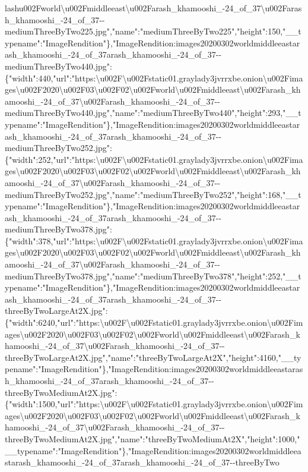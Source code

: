 lash{}u002Fworld\textbackslash{}u002Fmiddleeast\textbackslash{}u002Farash\_khamooshi\_-24\_of\_37\textbackslash{}u002Farash\_khamooshi\_-24\_of\_37-\/-mediumThreeByTwo225.jpg","name":"mediumThreeByTwo225","height":150,"\_\_typename":"ImageRendition"\},"ImageRendition:images20200302worldmiddleeastarash\_khamooshi\_-24\_of\_37arash\_khamooshi\_-24\_of\_37-\/-mediumThreeByTwo440.jpg":\{"width":440,"url":"https:\textbackslash{}u002F\textbackslash{}u002Fstatic01.graylady3jvrrxbe.onion\textbackslash{}u002Fimages\textbackslash{}u002F2020\textbackslash{}u002F03\textbackslash{}u002F02\textbackslash{}u002Fworld\textbackslash{}u002Fmiddleeast\textbackslash{}u002Farash\_khamooshi\_-24\_of\_37\textbackslash{}u002Farash\_khamooshi\_-24\_of\_37-\/-mediumThreeByTwo440.jpg","name":"mediumThreeByTwo440","height":293,"\_\_typename":"ImageRendition"\},"ImageRendition:images20200302worldmiddleeastarash\_khamooshi\_-24\_of\_37arash\_khamooshi\_-24\_of\_37-\/-mediumThreeByTwo252.jpg":\{"width":252,"url":"https:\textbackslash{}u002F\textbackslash{}u002Fstatic01.graylady3jvrrxbe.onion\textbackslash{}u002Fimages\textbackslash{}u002F2020\textbackslash{}u002F03\textbackslash{}u002F02\textbackslash{}u002Fworld\textbackslash{}u002Fmiddleeast\textbackslash{}u002Farash\_khamooshi\_-24\_of\_37\textbackslash{}u002Farash\_khamooshi\_-24\_of\_37-\/-mediumThreeByTwo252.jpg","name":"mediumThreeByTwo252","height":168,"\_\_typename":"ImageRendition"\},"ImageRendition:images20200302worldmiddleeastarash\_khamooshi\_-24\_of\_37arash\_khamooshi\_-24\_of\_37-\/-mediumThreeByTwo378.jpg":\{"width":378,"url":"https:\textbackslash{}u002F\textbackslash{}u002Fstatic01.graylady3jvrrxbe.onion\textbackslash{}u002Fimages\textbackslash{}u002F2020\textbackslash{}u002F03\textbackslash{}u002F02\textbackslash{}u002Fworld\textbackslash{}u002Fmiddleeast\textbackslash{}u002Farash\_khamooshi\_-24\_of\_37\textbackslash{}u002Farash\_khamooshi\_-24\_of\_37-\/-mediumThreeByTwo378.jpg","name":"mediumThreeByTwo378","height":252,"\_\_typename":"ImageRendition"\},"ImageRendition:images20200302worldmiddleeastarash\_khamooshi\_-24\_of\_37arash\_khamooshi\_-24\_of\_37-\/-threeByTwoLargeAt2X.jpg":\{"width":6240,"url":"https:\textbackslash{}u002F\textbackslash{}u002Fstatic01.graylady3jvrrxbe.onion\textbackslash{}u002Fimages\textbackslash{}u002F2020\textbackslash{}u002F03\textbackslash{}u002F02\textbackslash{}u002Fworld\textbackslash{}u002Fmiddleeast\textbackslash{}u002Farash\_khamooshi\_-24\_of\_37\textbackslash{}u002Farash\_khamooshi\_-24\_of\_37-\/-threeByTwoLargeAt2X.jpg","name":"threeByTwoLargeAt2X","height":4160,"\_\_typename":"ImageRendition"\},"ImageRendition:images20200302worldmiddleeastarash\_khamooshi\_-24\_of\_37arash\_khamooshi\_-24\_of\_37-\/-threeByTwoMediumAt2X.jpg":\{"width":1500,"url":"https:\textbackslash{}u002F\textbackslash{}u002Fstatic01.graylady3jvrrxbe.onion\textbackslash{}u002Fimages\textbackslash{}u002F2020\textbackslash{}u002F03\textbackslash{}u002F02\textbackslash{}u002Fworld\textbackslash{}u002Fmiddleeast\textbackslash{}u002Farash\_khamooshi\_-24\_of\_37\textbackslash{}u002Farash\_khamooshi\_-24\_of\_37-\/-threeByTwoMediumAt2X.jpg","name":"threeByTwoMediumAt2X","height":1000,"\_\_typename":"ImageRendition"\},"ImageRendition:images20200302worldmiddleeastarash\_khamooshi\_-24\_of\_37arash\_khamooshi\_-24\_of\_37-\/-threeByTwo